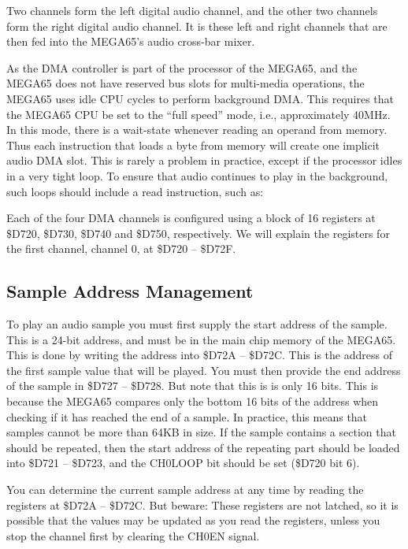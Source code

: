 Two channels form the left digital audio channel, and the other two
channels form the right digital audio channel. It is these left and
right channels that are then fed into the MEGA65's audio cross-bar
mixer.

As the DMA controller is part of the processor of the MEGA65, and the MEGA65 does not have reserved bus slots
  for multi-media operations, the MEGA65 uses idle CPU cycles to perform background DMA. This requires that the
  MEGA65 CPU be set to the ``full speed'' mode, i.e., approximately 40MHz.  In this mode, there is a wait-state
  whenever reading an operand from memory.  Thus each instruction that loads a byte from memory will create one
  implicit audio DMA slot.  This is rarely a problem in practice, except if the processor idles in a very tight
  loop.  To ensure that audio continues to play in the background, such loops should include a read instruction,
  such as:


Each of the four DMA channels is configured using a block of 16
registers at \$D720, \$D730, \$D740 and \$D750, respectively.
We will explain the registers for the first channel, channel 0, at
\$D720 -- \$D72F.

\subsection{Sample Address Management}

To play an audio sample you must first supply the start address of the
sample. This is a 24-bit address, and must be in the main chip memory
of the MEGA65. This is done by writing the address into \$D72A --
\$D72C.  This is the address of the first sample value that will be played.
You must then provide the end address of the sample in \$D727 --
\$D728.  But note that this is is only 16 bits. This is because the
MEGA65 compares only the bottom 16 bits of the address when checking
if it has reached the end of a sample.  In practice, this means that
samples cannot be more than 64KB in size.  If the sample contains a
section that should be repeated, then the start address of the
repeating part should be loaded into \$D721 -- \$D723, and the CH0LOOP
bit should be set (\$D720 bit 6).

You can determine the current sample address at any time by reading
the registers at \$D72A -- \$D72C. But beware: These registers are not
latched, so it is possible that the values may be updated as you read
the registers, unless you stop the channel first by clearing the CH0EN
signal.

